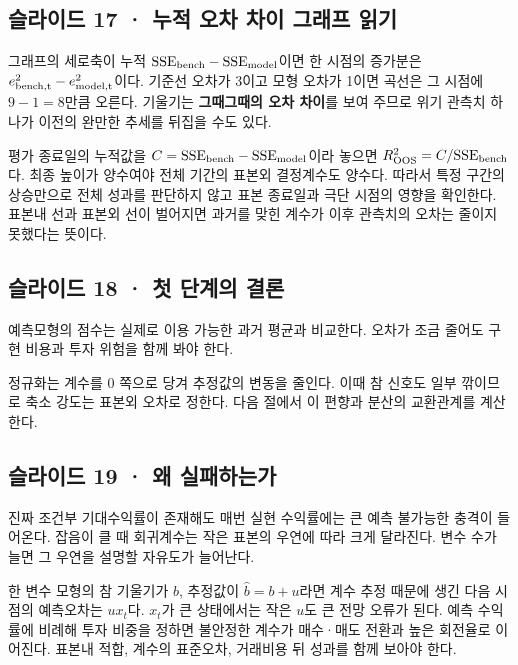 \documentclass[11pt,a4paper]{article}
\begin{document}
\subsection{슬라이드 17 · 누적 오차 차이 그래프 읽기}
그래프의 세로축이 누적 $\mathrm{SSE}_{\rm bench}-\mathrm{SSE}_{\rm model}$이면 한 시점의 증가분은 $e^2_{\rm bench,t}-e^2_{\rm model,t}$이다. 기준선 오차가 3이고 모형 오차가 1이면 곡선은 그 시점에 $9-1=8$만큼 오른다. 기울기는 \textbf{그때그때의 오차 차이}를 보여 주므로 위기 관측치 하나가 이전의 완만한 추세를 뒤집을 수도 있다.\par

평가 종료일의 누적값을 $C=\mathrm{SSE}_{\rm bench}-\mathrm{SSE}_{\rm model}$이라 놓으면 $R^2_{\rm OOS}=C/\mathrm{SSE}_{\rm bench}$다. 최종 높이가 양수여야 전체 기간의 표본외 결정계수도 양수다. 따라서 특정 구간의 상승만으로 전체 성과를 판단하지 않고 표본 종료일과 극단 시점의 영향을 확인한다. 표본내 선과 표본외 선이 벌어지면 과거를 맞힌 계수가 이후 관측치의 오차는 줄이지 못했다는 뜻이다.\par

\subsection{슬라이드 18 · 첫 단계의 결론}
예측모형의 점수는 실제로 이용 가능한 과거 평균과 비교한다. 오차가 조금 줄어도 구현 비용과 투자 위험을 함께 봐야 한다.\par

정규화는 계수를 0 쪽으로 당겨 추정값의 변동을 줄인다. 이때 참 신호도 일부 깎이므로 축소 강도는 표본외 오차로 정한다. 다음 절에서 이 편향과 분산의 교환관계를 계산한다.\par

\subsection{슬라이드 19 · 왜 실패하는가}
진짜 조건부 기대수익률이 존재해도 매번 실현 수익률에는 큰 예측 불가능한 충격이 들어온다. 잡음이 클 때 회귀계수는 작은 표본의 우연에 따라 크게 달라진다. 변수 수가 늘면 그 우연을 설명할 자유도가 늘어난다.\par

한 변수 모형의 참 기울기가 $b$, 추정값이 $\hat b=b+u$라면 계수 추정 때문에 생긴 다음 시점의 예측오차는 $ux_t$다. $x_t$가 큰 상태에서는 작은 $u$도 큰 전망 오류가 된다. 예측 수익률에 비례해 투자 비중을 정하면 불안정한 계수가 매수·매도 전환과 높은 회전율로 이어진다. 표본내 적합, 계수의 표준오차, 거래비용 뒤 성과를 함께 보아야 한다.\par
\end{document}
